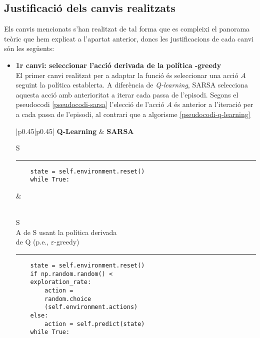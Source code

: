 \documentclass{article}
\begin{document}
\subsection{Justificació dels canvis realitzats}
Els canvis mencionats s'han realitzat de tal forma que es compleixi el panorama teòric que hem explicat a l'apartat anterior, doncs les justificacions de cada canvi són les següents:
\begin{itemize}
    \item \textbf{1r canvi: seleccionar l'acció derivada de la política \bm{$\varepsilon$}-greedy}\\
    El primer canvi realitzat per a adaptar la funció és seleccionar una acció \(A\) seguint la política establerta. A diferència de \textit{Q-learning}, SARSA selecciona aquesta acció amb anterioritat a iterar cada passa de l’episodi. 
    Segons el pseudocodi \ref{pseudocodi-sarsa} l'elecció de l'acció \(A\) és anterior a l'iteració per a cada passa de l'episodi, al contrari que a algorisme \ref{pseudocodi-q-learning}
    \begin{table}[h]
\begin{tabular}{|p{0.45\textwidth}|p{0.45\textwidth}|}
\hline
\textbf{Q-Learning} & \textbf{SARSA} \\
\hline
\begin{minipage}{\linewidth}
\begin{algorithmic}[H]
\STATE {} S \\
\end{algorithmic}
\noindent\rule{\linewidth}{0.4pt} 
\begin{verbatim}
    state = self.environment.reset()
    while True:
\end{verbatim}
\end{minipage}
&
\begin{minipage}{\linewidth}
\begin{algorithmic}[H]
\STATE \text{}\\
  S \\
  A de S usant la política derivada\\
 de Q (p.e., $\varepsilon$-greedy)\\
\end{algorithmic}
\noindent\rule{\linewidth}{0.4pt} 
\begin{verbatim}
    state = self.environment.reset()
    if np.random.random() <
    exploration_rate:
        action =
        random.choice
        (self.environment.actions)
    else:
        action = self.predict(state)
    while True:


\end{verbatim}
\end{minipage}
\end{tabular}
\end{table}
\end{itemize}
\end{document}
